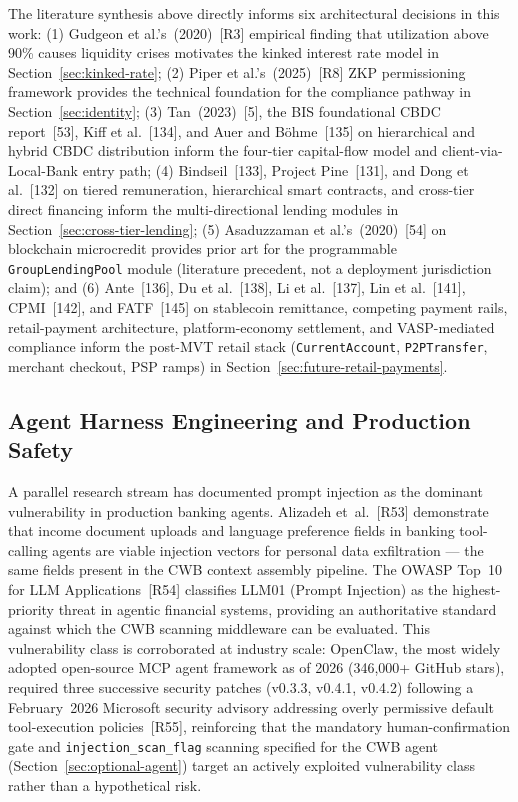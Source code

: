\documentclass[12pt,a4paper]{report}
\begin{document}
The literature synthesis above directly informs six architectural decisions in this work: (1) Gudgeon et al.'s~(2020)~[R3] empirical finding that utilization above 90\% causes liquidity crises motivates the kinked interest rate model in Section~\ref{sec:kinked-rate}; (2) Piper et al.'s~(2025)~[R8] ZKP permissioning framework provides the technical foundation for the compliance pathway in Section~\ref{sec:identity}; (3) Tan~(2023)~[5], the BIS foundational CBDC report~[53], Kiff et al.~[134], and Auer and B\"{o}hme~[135] on hierarchical and hybrid CBDC distribution inform the four-tier capital-flow model and client-via-Local-Bank entry path; (4) Bindseil~[133], Project Pine~[131], and Dong et al.~[132] on tiered remuneration, hierarchical smart contracts, and cross-tier direct financing inform the multi-directional lending modules in Section~\ref{sec:cross-tier-lending}; (5) Asaduzzaman et al.'s~(2020)~[54] on blockchain microcredit provides prior art for the programmable \texttt{GroupLendingPool} module (literature precedent, not a deployment jurisdiction claim); and (6) Ante~[136], Du et al.~[138], Li et al.~[137], Lin et al.~[141], CPMI~[142], and FATF~[145] on stablecoin remittance, competing payment rails, retail-payment architecture, platform-economy settlement, and VASP-mediated compliance inform the post-MVT retail stack (\texttt{CurrentAccount}, \texttt{P2PTransfer}, merchant checkout, PSP ramps) in Section~\ref{sec:future-retail-payments}.

\subsection{Agent Harness Engineering and Production Safety}
\label{sec:harness-lit}

A parallel research stream has documented prompt injection as the dominant
vulnerability in production banking agents. Alizadeh et~al.~[R53]
demonstrate that income document uploads and language preference fields in
banking tool-calling agents are viable injection vectors for personal data
exfiltration --- the same fields present in the CWB context assembly pipeline.
The OWASP Top~10 for LLM Applications~[R54] classifies LLM01 (Prompt
Injection) as the highest-priority threat in agentic financial systems, providing
an authoritative standard against which the CWB scanning middleware can be
evaluated.
This vulnerability class is corroborated at industry scale: OpenClaw, the
most widely adopted open-source MCP agent framework as of 2026
(346{,}000+ GitHub stars), required three successive security patches
(v0.3.3, v0.4.1, v0.4.2) following a February~2026 Microsoft security
advisory addressing overly permissive default tool-execution
policies~[R55], reinforcing that the mandatory human-confirmation gate
and \texttt{injection\_scan\_flag} scanning specified for the CWB agent
(Section~\ref{sec:optional-agent}) target an actively exploited
vulnerability class rather than a hypothetical risk.
\end{document}
